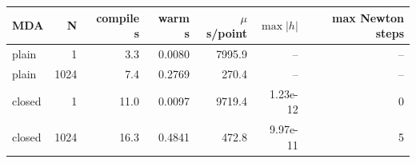 \begin{tabular}{lrrrrrr}
\toprule
MDA & N & compile s & warm s & $\mu$s/point & $\max|h|$ & max Newton steps \\
\midrule
plain & 1 & 3.3 & 0.0080 & 7995.9 & -- & -- \\
plain & 1024 & 7.4 & 0.2769 & 270.4 & -- & -- \\
closed & 1 & 11.0 & 0.0097 & 9719.4 & 1.23e-12 & 0 \\
closed & 1024 & 16.3 & 0.4841 & 472.8 & 9.97e-11 & 5 \\
\bottomrule
\end{tabular}
